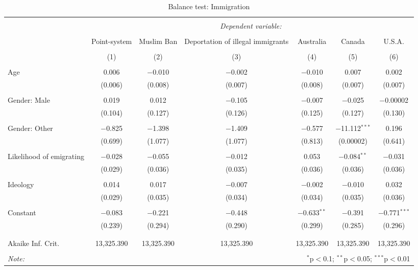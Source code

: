 \documentclass[12pt]{article}
\begin{document}
\begin{appendices}
\begin{landscape}
\begin{table}[!htbp] \centering 
  \caption{Balance test: Immigration} 
  \label{tab:balance5} 
\begin{tabular}{@{\extracolsep{5pt}}lcccccc} 
\\[-1.8ex]\hline 
\hline \\[-1.8ex] 
 & \multicolumn{6}{c}{\textit{Dependent variable:}} \\ 
\cline{2-7} 
\\[-1.8ex] & Point-system & Muslim Ban & Deportation of illegal immigrants & Australia & Canada & U.S.A. \\ 
\\[-1.8ex] & (1) & (2) & (3) & (4) & (5) & (6)\\ 
\hline \\[-1.8ex] 
 Age & 0.006 & $-$0.010 & $-$0.002 & $-$0.010 & 0.007 & 0.002 \\ 
  & (0.006) & (0.008) & (0.007) & (0.008) & (0.007) & (0.007) \\ 
  & & & & & & \\ 
 Gender: Male & 0.019 & 0.012 & $-$0.105 & $-$0.007 & $-$0.025 & $-$0.00002 \\ 
  & (0.104) & (0.127) & (0.126) & (0.125) & (0.127) & (0.130) \\ 
  & & & & & & \\ 
 Gender: Other & $-$0.825 & $-$1.398 & $-$1.409 & $-$0.577 & $-$11.112$^{***}$ & 0.196 \\ 
  & (0.699) & (1.077) & (1.077) & (0.813) & (0.00002) & (0.641) \\ 
  & & & & & & \\ 
 Likelihood of emigrating & $-$0.028 & $-$0.055 & $-$0.012 & 0.053 & $-$0.084$^{**}$ & $-$0.031 \\ 
  & (0.029) & (0.036) & (0.035) & (0.036) & (0.036) & (0.036) \\ 
  & & & & & & \\ 
 Ideology & 0.014 & 0.017 & $-$0.007 & $-$0.002 & $-$0.010 & 0.032 \\ 
  & (0.029) & (0.035) & (0.034) & (0.034) & (0.035) & (0.036) \\ 
  & & & & & & \\ 
 Constant & $-$0.083 & $-$0.221 & $-$0.448 & $-$0.633$^{**}$ & $-$0.391 & $-$0.771$^{***}$ \\ 
  & (0.239) & (0.294) & (0.290) & (0.299) & (0.285) & (0.296) \\ 
  & & & & & & \\ 
\hline \\[-1.8ex] 
Akaike Inf. Crit. & 13,325.390 & 13,325.390 & 13,325.390 & 13,325.390 & 13,325.390 & 13,325.390 \\ 
\hline 
\hline \\[-1.8ex] 
\textit{Note:}  & \multicolumn{6}{r}{$^{*}$p$<$0.1; $^{**}$p$<$0.05; $^{***}$p$<$0.01} \\ 
\end{tabular} 
\end{table}
\end{landscape}


\end{appendices}
\end{document}
